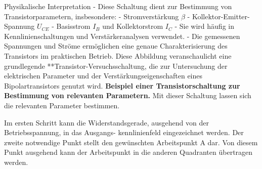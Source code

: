 {\begin{bsp}{}{}
{{        Physikalische Interpretation
        - Diese Schaltung dient zur Bestimmung von Transistorparametern, insbesondere:
        - Stromverstärkung \( \beta \)
        - Kollektor-Emitter-Spannung \( U_{CE} \)
        - Basisstrom \( I_B \) und Kollektorstrom \( I_C \)  
        - Sie wird häufig in Kennlinienschaltungen und Verstärkeranalysen verwendet.  
        - Die gemessenen Spannungen und Ströme ermöglichen eine genaue Charakterisierung des Transistors im praktischen Betrieb.  
        Diese Abbildung veranschaulicht eine grundlegende **Transistor-Versuchsschaltung, die zur Untersuchung der elektrischen Parameter und der Verstärkungseigenschaften eines Bipolartransistors genutzt wird.}
    }
    {\textbf{Beispiel einer Transistorschaltung zur Bestimmung von relevanten Parametern.} Mit dieser Schaltung lassen sich die relevanten Parameter bestimmen. 
        \label{fig:BeispieleinerTransistorschaltungZurBestimmungvonRelevantenParametern.}}
    


Im ersten Schritt kann die Widerstandsgerade, ausgehend von der Betriebsspannung, in das Ausgangs-
kennlinienfeld eingezeichnet werden. Der zweite notwendige Punkt stellt den gewünschten
Arbeitspunkt A dar. Von diesem Punkt ausgehend kann der Arbeitspunkt in die anderen Quadranten
übertragen werden.




\end{bsp}}
